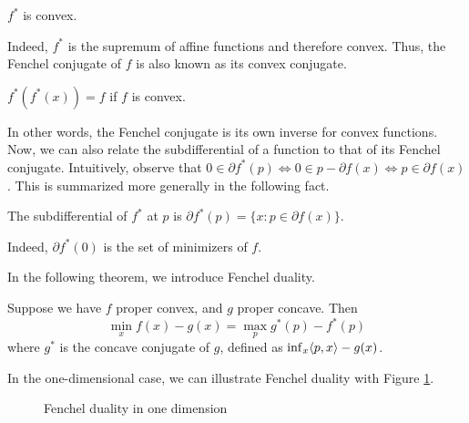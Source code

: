 \begin{fact}
$f^*$ is convex.
\end{fact}

Indeed, $f^*$ is the supremum of affine functions and therefore convex. Thus, the Fenchel conjugate of $f$ is also known as its convex conjugate.

\begin{fact}
$f^*(f^*(x)) = f$ if $f$ is convex.
\end{fact}

In other words, the Fenchel conjugate is its own inverse for convex functions. Now, we can also relate the subdifferential of a function to that of its Fenchel conjugate. Intuitively, observe that $0 \in \partial f^*(p) \iff 0 \in  p - \partial f(x) \iff p \in \partial f(x)$. This is summarized more generally in the following fact.

\begin{fact}
The subdifferential of $f^*$ at $p$ is $\partial f^*(p) = \{x: p \in \partial f(x)\}$. 
\end{fact}

Indeed, $\partial f^*(0)$ is the set of minimizers of $f$. 

In the following theorem, we introduce Fenchel duality.

\begin{theorem}\label{thm:fenchel}
Suppose we have $f$ proper convex, and $g$ proper concave. Then \[\min_x f(x)- g(x) = \max_p g^*(p) - f^*(p) \]
where $g^*$ is the concave conjugate of $g$, defined as $\inf_x \langle p,x\rangle - g(x)$.
\end{theorem}

In the one-dimensional case, we can illustrate Fenchel duality with Figure \ref{fig:fenc_conj}.

	
\begin{figure}[h]
	\centering
		\caption{Fenchel duality in one dimension}\label{fig:fenc_conj}
\end{figure}

